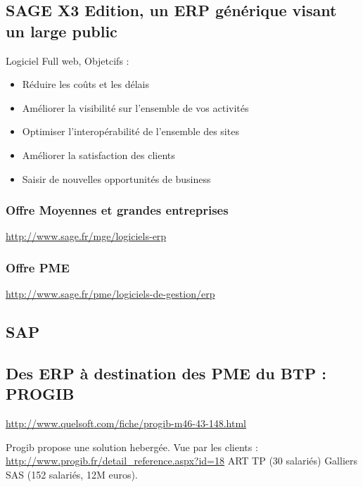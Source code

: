 \subsection{SAGE X3 Edition, un ERP générique visant un large public}
Logiciel Full web,
Objetcifs :
\begin{itemize}
    \item Réduire les coûts et les délais
    \item Améliorer la visibilité sur l'ensemble de vos activités
	\item Optimiser l'interopérabilité de l'ensemble des sites
    \item Améliorer la satisfaction des clients
	\item Saisir de nouvelles opportunités de business
\end{itemize}

\subsubsection{Offre Moyennes et grandes entreprises}
\url{http://www.sage.fr/mge/logiciels-erp}
\subsubsection{Offre PME}
\url{http://www.sage.fr/pme/logiciels-de-gestion/erp}

\subsection{SAP}

\subsection{Des ERP à destination des PME du BTP : PROGIB}
\url{http://www.quelsoft.com/fiche/progib-m46-43-148.html}
 
Progib propose une solution hebergée.
Vue par les clients :
\url{http://www.progib.fr/detail_reference.aspx?id=18} ART TP (30 salariés)
Galliers SAS (152 salariés, 12M euros).